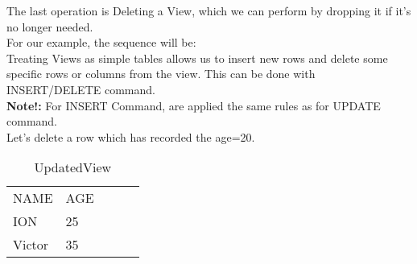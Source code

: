 The last operation is Deleting a View, which we can perform by dropping it if it's no longer needed.\\

For our example, the sequence will be:\\

\clearpage
Treating Views as simple tables allows us to insert new rows and delete some specific rows or columns from the view. This can be done with INSERT/DELETE command.\\

\textbf{Note!:} For INSERT Command, are applied the same rules as for UPDATE command.\\
Let's delete a row which has recorded the age=20.
\begin{table}[ht!]
\centering
\caption{UpdatedView}
\begin{tabular}{lllll}
NAME   & AGE &  &  &  \\
ION    & 25  &  &  &  \\
Victor & 35  &  &  &  
\end{tabular}
\end{table}


\clearpage
